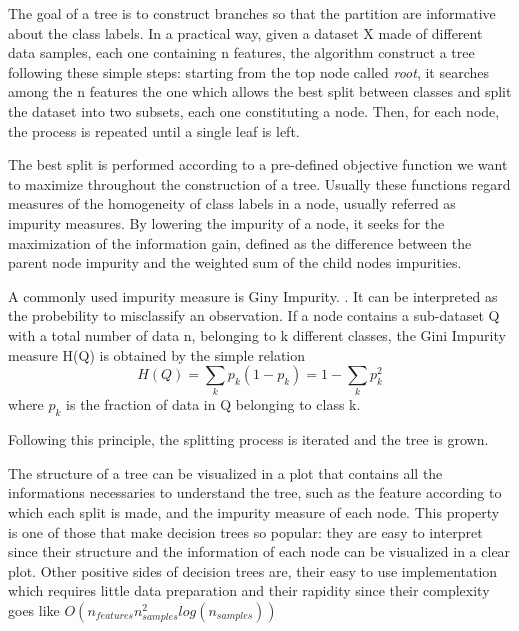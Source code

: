 \documentclass[11pt]{report}
\begin{document}
The goal of a tree is to construct branches so that the partition are informative about the class labels.
In a practical way, given a dataset X made of different data samples, each one containing n features, the algorithm construct a tree following these simple steps:
starting from the top node called \emph{root}, it searches among the n features the one which allows the best split between classes and split the dataset into two subsets, each one constituting a node. Then, for each node, the process is repeated until a single leaf is left.

The best split is performed according to a pre-defined objective function we want to maximize throughout the construction of a tree.
Usually these functions regard measures of the homogeneity of class labels in a node, usually referred as impurity measures.
By lowering the impurity of a node, it seeks for the maximization of the information gain, defined as the difference between the parent node impurity and the weighted sum of the child nodes impurities.

A commonly used impurity measure is Giny Impurity. \cite{raschka-2019}.
It can be interpreted as the probebility to misclassify an observation.
If a node contains a sub-dataset Q with a total number of data n, belonging to k different classes, the Gini Impurity measure H(Q) is obtained by the simple relation
\begin{equation}
H(Q)=\sum_k p_{k}(1-p_{k}) = 1- \sum_k p_k^2
\end{equation}
where $p_k$ is the fraction of data in Q belonging to class k.


Following this principle, the splitting process is iterated and the tree is grown.

The structure of a tree can be visualized in a plot that contains all the informations necessaries to understand the tree, such as the feature according to which each split is made, and the impurity measure of each node.
This property is one of those that make decision trees so popular: they are easy to interpret since their structure and the information of each node can be visualized in a clear plot.
Other positive sides of decision trees are, their easy to use implementation which requires little data preparation and their rapidity since their complexity goes like $O(n_{features}n_{samples}^2log(n_{samples}))$ \cite{scikit-2011}
\end{document}
